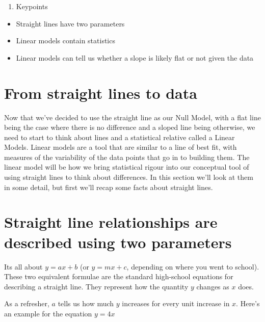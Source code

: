 \documentclass[
]{book}
\providecommand{\tightlist}{%
  \setlength{\itemsep}{0pt}\setlength{\parskip}{0pt}}
\begin{document}
\begin{enumerate}
\def\labelenumi{\arabic{enumi}.}
\setcounter{enumi}{2}
\tightlist
\item
  Keypoints
\end{enumerate}

\begin{itemize}
\tightlist
\item
  Straight lines have two parameters
\item
  Linear models contain statistics
\item
  Linear models can tell us whether a slope is likely flat or not given the data
\end{itemize}

\hypertarget{from-straight-lines-to-data}{%
\section{From straight lines to data}\label{from-straight-lines-to-data}}

Now that we've decided to use the straight line as our Null Model, with a flat line being the case where there is no difference and a sloped line being otherwise, we need to start to think about lines and a statistical relative called a Linear Models. Linear models are a tool that are similar to a line of best fit, with measures of the variability of the data points that go in to building them. The linear model will be how we bring statistical rigour into our conceptual tool of using straight lines to think about differences. In this section we'll look at them in some detail, but first we'll recap some facts about straight lines.

\hypertarget{straight-line-relationships-are-described-using-two-parameters}{%
\section{Straight line relationships are described using two parameters}\label{straight-line-relationships-are-described-using-two-parameters}}

Its all about \(y = ax + b\) (or \(y = mx + c\), depending on where you went to school). These two equivalent formulae are the standard high-school equations for describing a straight line. They represent how the quantity \(y\) changes as \(x\) does.

As a refresher, \(a\) tells us how much \(y\) increases for every unit increase in \(x\). Here's an example for the equation \(y = 4x\)
\end{document}
